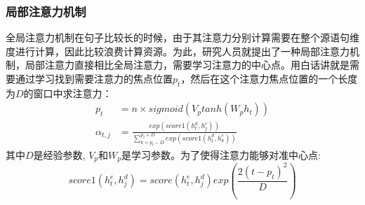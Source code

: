 \documentclass[twoside,a4paper,12pt]{book}%
\begin{document}
\subsubsection{局部注意力机制}
全局注意力机制在句子比较长的时候，由于其注意力分别计算需要在整个源语句维度进行计算，因此比较浪费计算资源。为此，研究人员就提出了一种局部注意力机制，局部注意力直接相比全局注意力，需要学习注意力的中心点。用白话讲就是需要通过学习找到需要注意力的焦点位置$p_t$，然后在这个注意力焦点位置的一个长度为$D$的窗口中求注意力：
$$
\begin{aligned}
p_t &= n \times sigmoid(V_p tanh(W_ph_t)) \\
\alpha_{t,j} &= \frac{exp(score1(h^d_{t},h^e_j))}{\sum_{k=p_t-D}^{p_t+D}{exp(score1(h^d_{t},h^e_k))}}
\end{aligned}
$$
其中$D$是经验参数, $V_p$和$W_p$是学习参数。为了使得注意力能够对准中心点:
$$score1(h^e_t,h^d_j)=score(h^e_t,h^d_j)exp(\frac{2(t-p_t)^2}{D})$$
\end{document}
